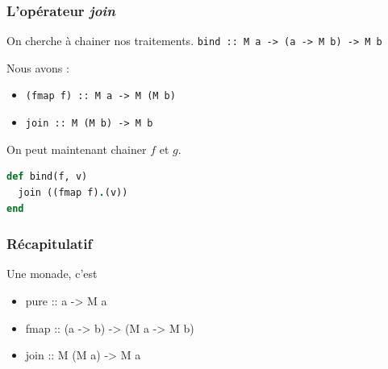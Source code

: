 \documentclass{beamer}
\begin{document}
\begin{frame}[fragile]
\frametitle{L'opérateur \emph{join}}
\begin{block}{On cherche à chainer nos traitements.}
\verb!bind :: M a -> (a -> M b) -> M b!
\end{block}

\pause

\begin{block}{Nous avons :}
\begin{itemize}
\item \verb!(fmap f) :: M a -> M (M b)!
\item \verb!join :: M (M b) -> M b!
\end{itemize}
\end{block}
\pause

\begin{block}{On peut maintenant chainer $f$ et $g$.}
\begin{lstlisting}[language=ruby]
def bind(f, v)
  join ((fmap f).(v))
end
\end{lstlisting}
\end{block}
\end{frame}

\begin{frame}
\frametitle{Récapitulatif}

\begin{block}{Une monade, c'est}

	\begin{itemize}
		\item pure :: a -> M a
		\item fmap :: (a -> b) -> (M a -> M b)
		\item join :: M (M a) -> M a
	\end{itemize}

\end{block}

\end{frame}
\end{document}
